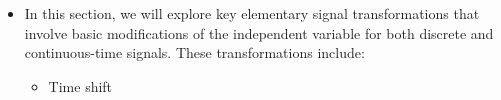 \begin{itemize}
    \begin{itemize}

      \item In this section, we will explore key elementary signal transformations that involve basic modifications of the independent variable for both discrete and continuous-time signals. These transformations include:

        \begin{itemize}

          \item Time shift

        \end{itemize}

    \end{itemize}

\end{itemize}



